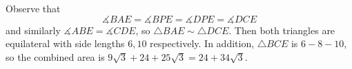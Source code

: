 Observe that \[\measuredangle{BAE}=\measuredangle{BPE}=\measuredangle{DPE}=\measuredangle{DCE}\] and similarly $\measuredangle{ABE}=\measuredangle{CDE}$, so $\triangle{BAE}\sim\triangle{DCE}$. Then both triangles are equilateral with side lengths $6,10$ respectively. In addition, $\triangle{BCE}$ is $6-8-10$, so the combined area is $9\sqrt{3}+24+25\sqrt{3}=\boxed{24+34\sqrt{3}}$.